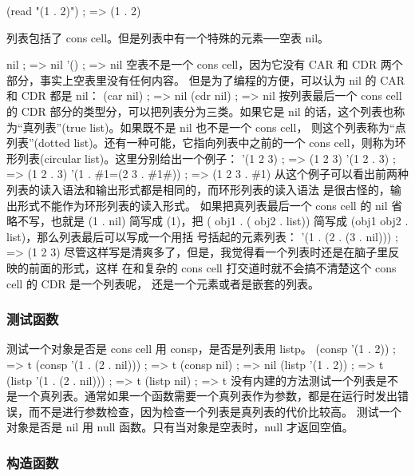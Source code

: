\documentclass[11pt]{ctexart}
\begin{document}
(read "(1 . 2)")                        ; => (1 . 2)

列表包括了 cons cell。但是列表中有一个特殊的元素──空表 nil。

nil                                     ; => nil
'()                                     ; => nil
空表不是一个 cons cell，因为它没有 CAR 和 CDR 两个部分，事实上空表里没有任何内容。
但是为了编程的方便，可以认为 nil 的 CAR 和 CDR 都是 nil：
(car nil)                               ; => nil
(cdr nil)                               ; => nil
按列表最后一个 cons cell 的 CDR 部分的类型分，可以把列表分为三类。如果它是 nil
的话，这个列表也称为“真列表”(true list)。如果既不是 nil 也不是一个 cons cell，
则这个列表称为“点列表”(dotted list)。还有一种可能，它指向列表中之前的一个 cons
cell，则称为环形列表(circular list)。这里分别给出一个例子：
'(1 2 3)                                  ; => (1 2 3)
'(1 2 . 3)                                ; => (1 2 . 3)
'(1 . \#1=(2 3 . \#1\#))                     ; => (1 2 3 . \#1)
从这个例子可以看出前两种列表的读入语法和输出形式都是相同的，而环形列表的读入语法
是很古怪的，输出形式不能作为环形列表的读入形式。
如果把真列表最后一个 cons cell 的 nil 省略不写，也就是 (1 . nil) 简写成 (1)，把
( obj1 . ( obj2 . list)) 简写成 (obj1 obj2 . list)，那么列表最后可以写成一个用括
号括起的元素列表：
'(1 . (2 . (3 . nil)))                  ; => (1 2 3)
尽管这样写是清爽多了，但是，我觉得看一个列表时还是在脑子里反映的前面的形式，这样
在和复杂的 cons cell 打交道时就不会搞不清楚这个 cons cell 的 CDR 是一个列表呢，
还是一个元素或者是嵌套的列表。
\subsubsection{测试函数}
\label{sec:orgf37d198}
测试一个对象是否是 cons cell 用 consp，是否是列表用 listp。
(consp '(1 . 2))                        ; => t
(consp '(1 . (2 . nil)))                ; => t
(consp nil)                             ; => nil
(listp '(1 . 2))                        ; => t
(listp '(1 . (2 . nil)))                ; => t
(listp nil)                             ; => t
没有内建的方法测试一个列表是不是一个真列表。通常如果一个函数需要一个真列表作为参数，都是在运行时发出错误，而不是进行参数检查，因为检查一个列表是真列表的代价比较高。
测试一个对象是否是 nil 用 null 函数。只有当对象是空表时，null 才返回空值。

\subsubsection{构造函数}
\label{sec:org38f1d69}
\end{document}
